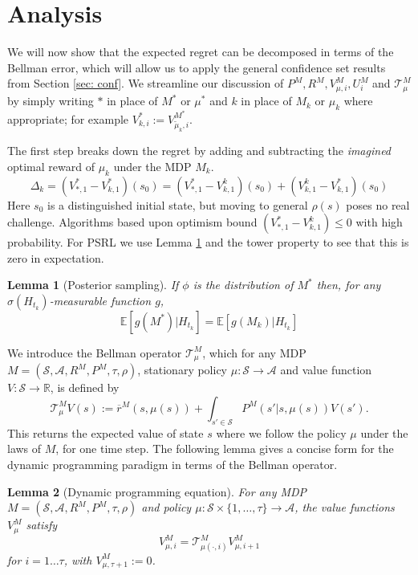 \documentclass{article}
\newtheorem{lemma}{Lemma}
\newcommand{\Exp}{\mathds{E}}
\newcommand{\Sc}{\mathcal{S}}
\newcommand{\Ac}{\mathcal{A}}
\newcommand{\Tc}{\mathcal{T}}
\begin{document}
\section{Analysis}
We will now show that the expected regret can be decomposed in terms of the Bellman error, which will allow us to apply the general confidence set results from Section \ref{sec: conf}.
We streamline our discussion of $P^{M}, R^{M}, V^{M}_{\mu,i}, U^{M}_{i}$ and $\Tc^M_\mu$ by simply writing $*$ in place of $M^*$ or $\mu^*$ and $k$ in place of $M_k$ or $\mu_k$ where appropriate; for example $V^*_{k,i} := V^{M^*}_{\tilde{\mu}_k,i}$.

The first step breaks down the regret by adding and subtracting the \emph{imagined} optimal reward of $\mu_k$ under the MDP $M_k$.
\begin{equation}
	\Delta_k = \left( V^*_{*,1} - V^*_{k,1} \right)(s_0)
	= \left( V^*_{*,1} - V^k_{k,1} \right)(s_0) + \left( V^k_{k,1} - V^*_{k,1} \right)(s_0)
\end{equation}
Here $s_0$ is a distinguished initial state, but moving to general $\rho(s)$ poses no real challenge.
Algorithms based upon optimism bound $( V^*_{*,1} - V^k_{k,1} ) \le 0$ with high probability.
For PSRL we use Lemma \ref{lem: ps} and the tower property to see that this is zero in expectation.
\begin{lemma}[Posterior sampling]
\label{lem: ps}
\hspace{0.00000000000001mm} \newline
If $\phi$ is the distribution of $M^*$ then, for any $\sigma(H_{t_k})$-measurable function $g$,
\begin{equation}
\label{eq: ps}
	\Exp [g(M^*) | H_{t_k} ] = \Exp [g(M_k) | H_{t_k} ]
\end{equation}
\end{lemma}

We introduce the Bellman operator $\mathcal{T}_{\mu}^{M}$, which for any MDP $M = (\Sc, \Ac, R^M, P^M, \tau, \rho)$, stationary policy $\mu:\Sc \rightarrow \Ac$ and value function $V:\Sc \rightarrow \mathds{R}$, is defined by
$$\mathcal{T}_{\mu}^{M} V(s) := \overline{r}^{M} (s, \mu(s)) + \int_{s' \in \Sc} P^{M}(s' | s, \mu(s)) V(s').$$
This returns the expected value of state $s$ where we follow the policy $\mu$ under the laws of $M$, for one time step.
The following lemma gives a concise form for the dynamic programming paradigm in terms of the Bellman operator.

\begin{lemma}[Dynamic programming equation]
\label{lem: DPl} \hspace{0.000000001mm} \newline
For any MDP $M = (\Sc, \Ac, R^M, P^M, \tau, \rho)$ and policy $\mu:\Sc \times \{1,\ldots,\tau\} \rightarrow \Ac$, the value functions $V^M_\mu$ satisfy
\begin{equation}\label{eq: DP}
V_{\mu,i}^{M} = \mathcal{T}_{\mu(\cdot,i)}^M V_{\mu,i+1}^M
\end{equation}
for $i=1\dots \tau$, with $V_{\mu,\tau+1}^{M} := 0$.
\end{lemma}
\end{document}
